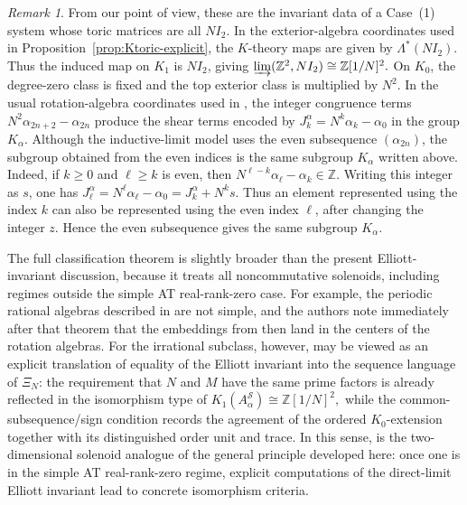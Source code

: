 \documentclass[11pt]{amsart}
\theoremstyle{definition}
\theoremstyle{remark}
\newtheorem{remark}[theorem]{Remark}
\newcommand{\Z}{\mathbb{Z}}
\begin{document}
\begin{remark}
From our point of view, these are the invariant data of a Case~\textup{(1)}
system whose toric matrices are all $NI_2$. In the exterior-algebra
coordinates used in Proposition~\ref{prop:Ktoric-explicit}, the $K$-theory
maps are given by $\Lambda^*(NI_2)$. 
Thus the induced map on $K_1$ is
$NI_2$, giving $\varinjlim(\Z^2,NI_2)\cong \mathbb Z[1/N]^2.$
On $K_0$, the degree-zero class is fixed and the top exterior class is
multiplied by $N^2$. In the usual rotation-algebra
coordinates used in \cite{LatPackSol}, the integer congruence terms
$N^2\alpha_{2n+2}-\alpha_{2n}$ produce the shear terms encoded by
$J_k^\alpha=N^k\alpha_k-\alpha_0$ in the group $K_\alpha$.  Although the inductive-limit model uses the even
subsequence $(\alpha_{2n})$, the subgroup obtained from the even indices is
the same subgroup $K_\alpha$ written above. Indeed, if $k\geq0$ and $\ell\geq k$ is even, then
$N^{\ell-k}\alpha_\ell-\alpha_k\in\Z$.  Writing this integer as $s$, one has $J_\ell^\alpha=N^\ell\alpha_\ell-\alpha_0=J_k^\alpha+N^k s.$
Thus an element represented using the index $k$ can also be represented using
the even index $\ell$, after changing the integer $z$.  Hence the even
subsequence gives the same subgroup $K_\alpha$.

The full classification theorem \cite[Theorem~4.2]{LatPackSol} is slightly
broader than the present Elliott-invariant discussion, because it treats all
noncommutative solenoids, including regimes outside the simple AT real-rank-zero
case. For example, the periodic rational algebras described in
\cite[Theorem~3.20]{LatPackSol} are not simple, and the authors note immediately
after that theorem that the embeddings from \cite[Theorem~3.6]{LatPackSol} then
land in the centers of the rotation algebras. For the irrational subclass,
however, \cite[Theorem~4.2]{LatPackSol} may be viewed as an explicit translation
of equality of the Elliott invariant into the sequence language of $\Xi_N$: the
requirement that $N$ and $M$ have the same prime factors is already reflected in
the isomorphism type of $K_1(A_\alpha^{\mathscr S})\cong \mathbb Z[1/N]^2,$
while the common-subsequence/sign condition records the agreement of the ordered
$K_0$-extension together with its distinguished order unit and trace. In this
sense, \cite[Theorem~4.2]{LatPackSol} is the two-dimensional solenoid analogue
of the general principle developed here: once one is in the simple AT
real-rank-zero regime, explicit computations of the direct-limit Elliott
invariant lead to concrete isomorphism criteria.
\end{remark}
\end{document}
